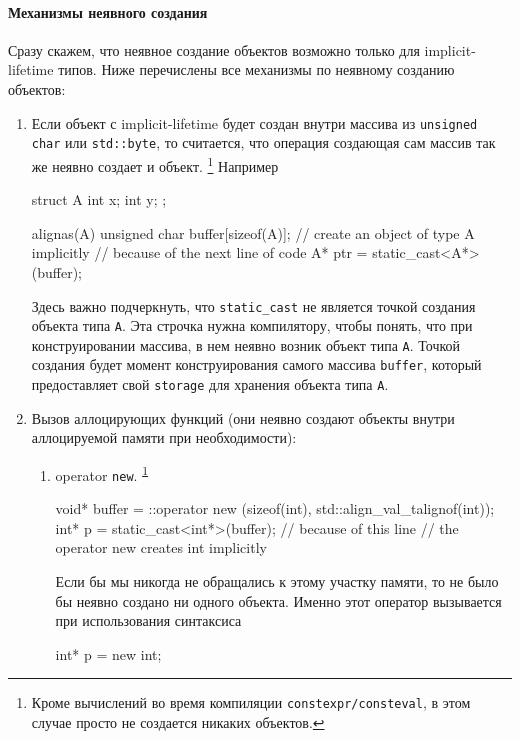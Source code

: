 \documentclass{article}
\begin{document}
\paragraph{Механизмы неявного создания}

Сразу скажем, что неявное создание объектов возможно только для implicit-lifetime типов.
Ниже перечислены все механизмы по неявному созданию объектов:
\begin{enumerate}
\item Если объект с implicit-lifetime будет создан внутри массива из \verb"unsigned char" или \verb"std::byte", то считается, что операция создающая сам массив так же неявно создает и объект.%
\footnote{\label{ref::constexpr}Кроме вычислений во время компиляции \verb"constexpr/consteval", в этом случае просто не создается никаких объектов.}
Например
\begin{cppcode}[numbers = none]
struct A {
  int x;
  int y;
};

alignas(A) unsigned char buffer[sizeof(A)]; // create an object of type A implicitly
                                            // because of the next line of code
A* ptr = static_cast<A*>(buffer); 
\end{cppcode}
Здесь важно подчеркнуть, что \verb"static_cast" не является точкой создания объекта типа \verb"A".
Эта строчка нужна компилятору, чтобы понять, что при конструировании массива, в нем неявно возник объект типа \verb"A".
Точкой создания будет момент конструирования самого массива \verb"buffer", который предоставляет свой \verb"storage" для хранения объекта типа \verb"A".

\item Вызов аллоцирующих функций (они неявно создают объекты внутри аллоцируемой памяти при необходимости):
\begin{enumerate}
\item operator \verb"new".%
\textsuperscript{\ref{ref::constexpr}}
\begin{cppcode}[numbers = none]
void* buffer = ::operator new (sizeof(int), std::align_val_t{alignof(int)});
int* p = static_cast<int*>(buffer); // because of this line
                                    // the operator new creates int implicitly
\end{cppcode}
Если бы мы никогда не обращались к этому участку памяти, то не было бы неявно создано ни одного объекта.
Именно этот оператор вызывается при использования синтаксиса
\begin{cppcode}[numbers = none]
int* p = new int;
\end{cppcode}


\end{enumerate}
\end{enumerate}
\end{document}
